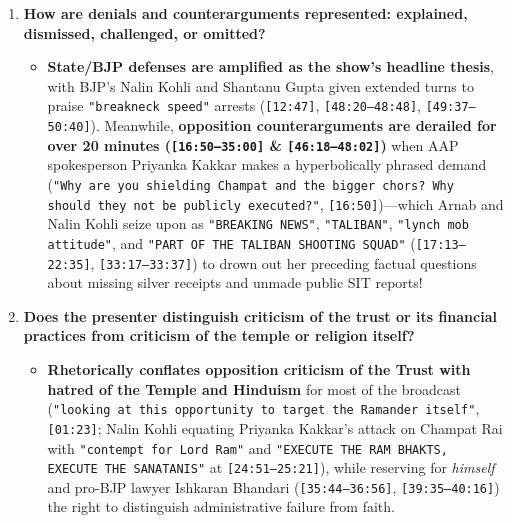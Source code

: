 \documentclass[10pt,a4paper]{article}
\begin{document}
\begin{enumerate}[leftmargin=1.6em, itemsep=4pt, topsep=4pt]
  \begin{itemize}[leftmargin=1.4em, itemsep=2pt, topsep=2pt]
    \item Official SIT findings---\texttt{8} named arrests, \texttt{"over 80 lakh rupees may have been stolen"}, and \texttt{"CCTV footage reportedly showing the accused taking cash at least 70 times"} (\texttt{[06:48--07:34]})---are presented with cautious journalistic hedging (\texttt{may have been}, \texttt{reportedly}). Conversely, whenever opposition panelists allege wider BJP/Trust complicity (e.g., Priyanka Kakkar citing Raju Manwani's \texttt{200 kg} silver bricks \& Champat Rai refusing PM summons at \texttt{[14:46--15:23]}; Major Ashish Chaturvedi alleging BJP leaders' involvement and \texttt{2020} private audit findings at \texttt{[27:34--28:14]}, \texttt{[31:25]}), Arnab aggressively demands courtroom-grade proof on the spot (\texttt{"NAME ONE... VALIDATE IT RIGHT NOW"}, \texttt{[31:43--32:10]}).
  \end{itemize}
  \item \textbf{How are denials and counterarguments represented: explained, dismissed, challenged, or omitted?}
  \begin{itemize}[leftmargin=1.4em, itemsep=2pt, topsep=2pt]
    \item \textbf{State/BJP defenses are amplified as the show's headline thesis}, with BJP's Nalin Kohli and Shantanu Gupta given extended turns to praise \texttt{"breakneck speed"} arrests (\texttt{[12:47]}, \texttt{[48:20--48:48]}, \texttt{[49:37--50:40]}). Meanwhile, \textbf{opposition counterarguments are derailed for over 20 minutes (\texttt{[16:50--35:00]} \& \texttt{[46:18--48:02]})} when AAP spokesperson Priyanka Kakkar makes a hyperbolically phrased demand (\texttt{"Why are you shielding Champat and the bigger chors? Why should they not be publicly executed?"}, \texttt{[16:50]})---which Arnab and Nalin Kohli seize upon as \texttt{"BREAKING NEWS"}, \texttt{"TALIBAN"}, \texttt{"lynch mob attitude"}, and \texttt{"PART OF THE TALIBAN SHOOTING SQUAD"} (\texttt{[17:13--22:35]}, \texttt{[33:17--33:37]}) to drown out her preceding factual questions about missing silver receipts and unmade public SIT reports!
  \end{itemize}
  \item \textbf{Does the presenter distinguish criticism of the trust or its financial practices from criticism of the temple or religion itself?}
  \begin{itemize}[leftmargin=1.4em, itemsep=2pt, topsep=2pt]
    \item \textbf{Rhetorically conflates opposition criticism of the Trust with hatred of the Temple and Hinduism} for most of the broadcast (\texttt{"looking at this opportunity to target the Ramander itself"}, \texttt{[01:23]}; Nalin Kohli equating Priyanka Kakkar's attack on Champat Rai with \texttt{"contempt for Lord Ram"} and \texttt{"EXECUTE THE RAM BHAKTS, EXECUTE THE SANATANIS"} at \texttt{[24:51--25:21]}), while reserving for \textit{himself} and pro-BJP lawyer Ishkaran Bhandari (\texttt{[35:44--36:56]}, \texttt{[39:35--40:16]}) the right to distinguish administrative failure from faith.

\end{itemize}
\end{enumerate}
\end{document}
